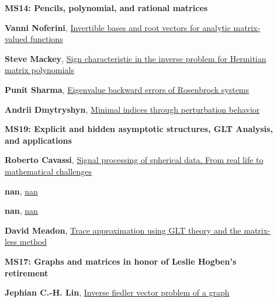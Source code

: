 \documentclass[ILAS2025-program.tex]{subfiles}
\begin{document}
\begin{description}
\begin{description}
        \end{description}
    \begin{description}
    \item[] {\color{mstitle}\textbf{MS14: Pencils, polynomial, and rational matrices}} 
    \item[] \hypertarget{up0213}{}\textbf{Vanni Noferini}, \hyperlink{down0213}{Invertible bases and root vectors for analytic matrix-valued functions}
        \item[] \hypertarget{up0214}{}\textbf{Steve Mackey}, \hyperlink{down0214}{Sign characteristic in the inverse problem for Hermitian matrix polynomials}
        \item[] \hypertarget{up0215}{}\textbf{Punit Sharma}, \hyperlink{down0215}{Eigenvalue backward errors of Rosenbrock systems}
        \item[] \hypertarget{up0216}{}\textbf{Andrii Dmytryshyn}, \hyperlink{down0216}{Minimal indices through perturbation behavior}
        \end{description}
    \begin{description}
    \item[] {\color{mstitle}\textbf{MS19: Explicit and hidden asymptotic structures, GLT Analysis, and applications}} 
    \item[] \hypertarget{up0217}{}\textbf{Roberto Cavassi}, \hyperlink{down0217}{Signal processing of spherical data. From real life to mathematical challenges}
        \item[] \hypertarget{up0218}{}\textbf{nan}, \hyperlink{down0218}{nan}
        \item[] \hypertarget{up0219}{}\textbf{nan}, \hyperlink{down0219}{nan}
        \item[] \hypertarget{up0220}{}\textbf{David Meadon}, \hyperlink{down0220}{Trace approximation using GLT theory and the matrix-less method
}
        \end{description}
    \begin{description}
    \item[] {\color{mstitle}\textbf{MS17: Graphs and matrices in honor of Leslie Hogben's retirement}} 
    \item[] \hypertarget{up0221}{}\textbf{Jephian C.-H. Lin}, \hyperlink{down0221}{Inverse fiedler vector problem of a graph
}
\end{description}
\end{description}
\end{document}

